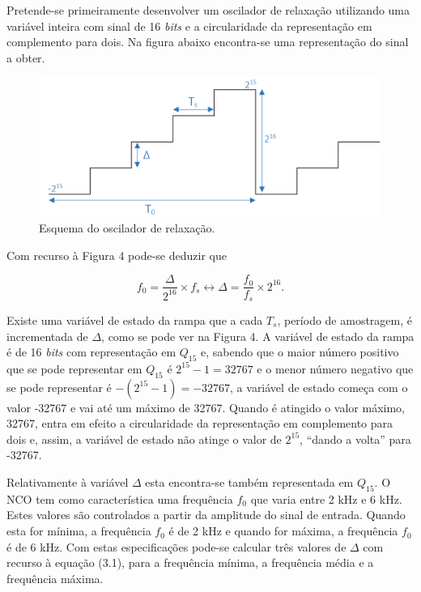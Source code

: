 \documentclass[11pt]{article}
\numberwithin{equation}{section}
\begin{document}
Pretende-se primeiramente desenvolver um oscilador de relaxação utilizando uma variável inteira com sinal de 16 \textit{bits} e a circularidade da representação em complemento para dois. Na figura abaixo encontra-se uma representação do sinal a obter.

\begin{figure}[H]
	\centering
	\includegraphics[keepaspectratio=true, scale=0.37]{teoricas/rampa}
	\caption{Esquema do oscilador de relaxação.}
	\vspace{-0.8em}
\end{figure}

Com recurso à Figura 4 pode-se deduzir que

\vspace{-3mm}
\begin{equation}
f_{0} = \frac{\Delta}{2^{16}} \times f_{s} \leftrightarrow \Delta = \frac{f_{0}}{f_{s}} \times 2^{16}.
\end{equation}

\vspace{1mm}
Existe uma variável de estado da rampa que a cada $T_{s}$, período de amostragem, é incrementada de $\Delta$, como se pode ver na Figura 4. A variável de estado da rampa é de 16 \textit{bits} com representação em $Q_{15}$ e, sabendo que o maior número positivo que se pode representar em $Q_{15}$ é $2^{15} - 1 = 32767$ e o menor número negativo que se pode representar é  $-(2^{15} - 1) = -32767$, a variável de estado começa com o valor -32767 e vai até um máximo de 32767. Quando é atingido o valor máximo, 32767, entra em efeito a circularidade da representação em complemento para dois e, assim, a variável de estado não atinge o valor de $2^{15}$, ``dando a volta'' para -32767. 

Relativamente à variável $\Delta$ esta encontra-se também representada em $Q_{15}$. O NCO tem como característica uma frequência $f_{0}$ que varia entre 2 kHz e 6 kHz. Estes valores são controlados a partir da amplitude do sinal de entrada. Quando esta for mínima, a frequência $f_{0}$ é de 2 kHz e quando for máxima, a frequência $f_{0}$ é de 6 kHz. Com estas especificações pode-se calcular três valores de $\Delta$ com recurso à equação (3.1), para a frequência mínima, a frequência média e a frequência máxima.
\end{document}
